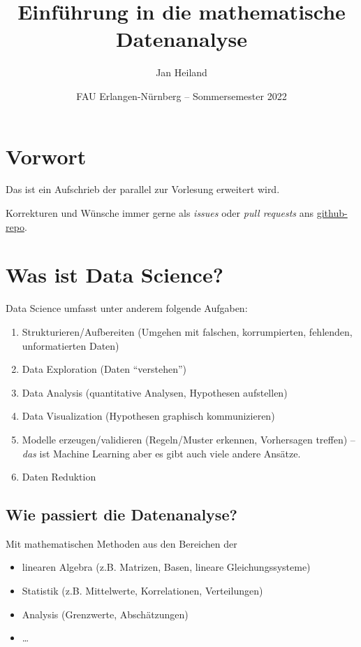 \documentclass[]{book}
\title{Einführung in die mathematische Datenanalyse}
\author{Jan Heiland}
\institute{FAU Erlangen-Nürnberg}
\date{FAU Erlangen-Nürnberg -- Sommersemester 2022}
\providecommand{\tightlist}{%
  \setlength{\itemsep}{0pt}\setlength{\parskip}{0pt}}
\theoremstyle{definition}
\theoremstyle{definition}
\theoremstyle{definition}
\theoremstyle{definition}
\theoremstyle{remark}
\begin{document}
\maketitle

{
\hypersetup{linkcolor=}
\setcounter{tocdepth}{1}
\tableofcontents
}
\hypertarget{vorwort}{%
\chapter*{Vorwort}\label{vorwort}}

Das ist ein Aufschrieb der parallel zur Vorlesung erweitert wird.

Korrekturen und Wünsche immer gerne als \emph{issues} oder \emph{pull requests} ans \href{https://github.com/highlando/script-emds}{github-repo}.

\hypertarget{was-ist-data-science}{%
\chapter{Was ist Data Science?}\label{was-ist-data-science}}

Data Science umfasst unter anderem folgende Aufgaben:

\begin{enumerate}
\def\labelenumi{\arabic{enumi}.}
\item
  Strukturieren/Aufbereiten (Umgehen mit falschen, korrumpierten, fehlenden,
  unformatierten Daten)
\item
  Data Exploration (Daten ``verstehen'')
\item
  Data Analysis (quantitative Analysen, Hypothesen aufstellen)
\item
  Data Visualization (Hypothesen graphisch kommunizieren)
\item
  Modelle erzeugen/validieren (Regeln/Muster erkennen, Vorhersagen treffen) -- \emph{das} ist Machine Learning aber es gibt auch viele andere Ansätze.
\item
  Daten Reduktion
\end{enumerate}

\hypertarget{wie-passiert-die-datenanalyse}{%
\section{Wie passiert die Datenanalyse?}\label{wie-passiert-die-datenanalyse}}

Mit mathematischen Methoden aus den Bereichen der

\begin{itemize}
\tightlist
\item
  linearen Algebra (z.B. Matrizen, Basen, lineare Gleichungssysteme)
\item
  Statistik (z.B. Mittelwerte, Korrelationen, Verteilungen)
\item
  Analysis (Grenzwerte, Abschätzungen)
\item
  \ldots{}
\end{itemize}
\end{document}
